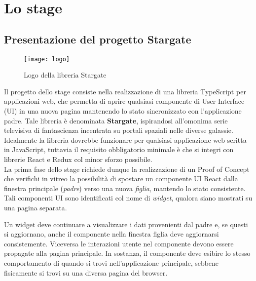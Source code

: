 
\chapter{Lo stage}
\label{cap:descrizione-stage}

\section{Presentazione del progetto Stargate}

\begin{figure}[H] 
  \centering 
  \texttt{[image: logo]} 
  \caption{Logo della libreria Stargate}
\end{figure}

Il progetto dello stage consiste nella realizzazione di una libreria \gls{TypeScript} per applicazioni web, che permetta di aprire qualsiasi componente di User Interface (UI) in una nuova pagina mantenendo lo stato sincronizzato con l'applicazione padre. Tale libreria è denominata \textbf{Stargate}, ispirandosi all'omonima serie televisiva di fantascienza incentrata su portali spaziali nelle diverse galassie. Idealmente la libreria dovrebbe funzionare per qualsiasi applicazione web scritta in \gls{JavaScript}, tuttavia il requisito obbligatorio minimale è che si integri con librerie \gls{React} e \gls{Redux} col minor sforzo possibile.\\

La prima fase dello stage richiede dunque la realizzazione di un Proof of Concept che verifichi in vitreo la possibilità di spostare un componente UI React dalla finestra principale (\textit{padre}) verso una nuova \textit{figlia}, mantendo lo stato consistente. Tali componenti UI sono identificati col nome di \textit{widget}, qualora siano mostrati su una pagina separata.

Un widget deve continuare a visualizzare i dati provenienti dal padre e, se questi si aggiornano, anche il componente nella finestra figlia deve aggiornarsi consistemente. Viceversa le interazioni utente nel componente devono essere propagate alla pagina principale. In sostanza, il componente deve esibire lo stesso comportamento di quando si trovi nell'applicazione principale, sebbene fisicamente si trovi su una diversa pagina del browser.

